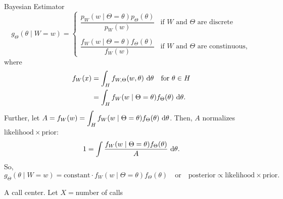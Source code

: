 \begin{thm}{Bayesian Estimator}
	\[g_\Theta(\theta\mid W=w)=\begin{cases}\dfrac{p_W(w\mid\Theta=\theta)p_\Theta(\theta)}{p_W(w)}&\text{if }W\text{ and }\Theta\text{ are discrete}\\\\\dfrac{f_W(w\mid\Theta=\theta)f_\Theta(\theta)}{f_W(w)}&\text{if }W\text{ and }\Theta\text{ are constinuous},\end{cases}\]	
	where \begin{align*}f_W(x)&=\int_Hf_{W,\Theta}(w,\theta)\ \d{\theta}\quad\text{for }\theta\in H\\&=\int_Hf_W(w\mid\Theta=\theta)f_\Theta(\theta)\ \d{\theta}.\end{align*} Further, let $A=f_W(w)=\dsst\int_Hf_W(w\mid\Theta=\theta)f_\Theta(\theta)\ \d{\theta}$. Then, $A$ normalizes $\mathrm{likelihood}\times\mathrm{prior}$: \[1=\int\dfrac{f_W(w\mid\Theta=\theta)f_\Theta(\theta)}{A}\ \d{\theta}.\] So, \[g_\Theta(\theta\mid W=w)=\text{constant}\cdot f_W(w\mid\Theta=\theta)f_\Theta(\theta)\quad\text{or}\quad\mathrm{posterior}\propto\mathrm{likelihood}\times\mathrm{prior}.\]
\end{thm}
\begin{eg}
	A call center. Let $X=$number of calls 	
\end{eg}

